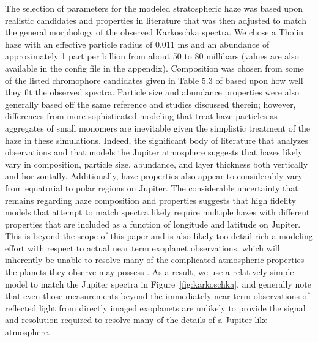 \documentclass[12pt, letterpaper]{aastex631}
\begin{document}
The selection of parameters for the modeled stratospheric haze was based upon realistic candidates and properties in literature \citep{2004jpsm.book...79W} that was then adjusted to match the general morphology of the observed Karkoschka spectra.  We chose a Tholin haze with an effective particle radius of 0.011 \bm{$\mu$}ms and an abundance of approximately 1 part per billion from about 50 to 80 millibars (values are also available in the config file in the appendix). Composition was chosen from some of the listed chromophore candidates given in Table 5.3 of \textcite{2004jpsm.book...79W} based upon how well they fit the observed spectra. Particle size and abundance properties were also generally based off the same reference and studies discussed therein; however, differences from more sophisticated modeling that treat haze particles as aggregates of small monomers are inevitable given the simplistic treatment of the haze in these simulations.  Indeed, the significant body of literature that analyzes observations and that models the Jupiter atmosphere suggests that hazes likely vary in composition, particle size, abundance, and layer thickness both vertically and horizontally.  Additionally, haze properties also appear to considerably vary from equatorial to polar regions on Jupiter. The considerable uncertainty that remains regarding haze composition and properties suggests that high fidelity models that attempt to match spectra likely require multiple hazes with different properties that are included as a function of longitude and latitude on Jupiter.  This is beyond the scope of this paper and is also likely too detail-rich a modeling effort with respect to actual near term exoplanet observations, which will inherently be unable to resolve many of the complicated atmospheric properties the planets they observe may possess \citep{2016AJ....152..217L}.  As a result, we use a relatively simple model to match the Jupiter spectra in Figure~\ref{fig:karkoschka}, and generally note that even those measurements beyond the immediately near-term observations of reflected light from directly imaged exoplanets are unlikely to provide the signal and resolution required to resolve many of the details of a Jupiter-like atmosphere.    
\end{document}
